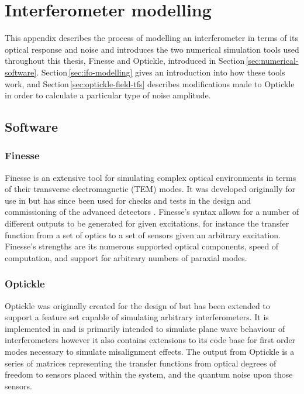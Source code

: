 \chapter{\label{a:simulation-tools}Interferometer modelling}
This appendix describes the process of modelling an interferometer in terms of its optical response and noise and introduces the two numerical simulation tools used throughout this thesis, Finesse and Optickle, introduced in Section\,\ref{sec:numerical-software}. Section\,\ref{sec:ifo-modelling} gives an introduction into how these tools work, and Section\,\ref{sec:optickle-field-tfs} describes modifications made to Optickle in order to calculate a particular type of noise amplitude.

\section{\label{sec:numerical-software}Software}
\subsection{\label{sec:finesse-sim}Finesse}
Finesse is an extensive tool for simulating complex optical environments in terms of their transverse electromagnetic (\gls{TEM}) modes. It was developed originally for use in \GEO{} \cite{Freise2004} but has since been used for checks and tests in the design and commissioning of the advanced detectors \cite{Mueller2015, Kumeta2015}. Finesse's syntax allows for a number of different outputs to be generated for given excitations, for instance the transfer function from a set of optics to a set of sensors given an arbitrary excitation. Finesse's strengths are its numerous supported optical components, speed of computation, and support for arbitrary numbers of paraxial modes.

\subsection{\label{sec:optickle-sim}Optickle}
Optickle was originally created for the design of \ALIGO{} but has been extended to support a feature set capable of simulating arbitrary interferometers. It is implemented in \MATLAB{} and is primarily intended to simulate plane wave behaviour of interferometers however it also contains extensions to its code base for first order modes necessary to simulate misalignment effects. The output from Optickle is a series of matrices representing the transfer functions from optical degrees of freedom to sensors placed within the system, and the quantum noise upon those sensors.

